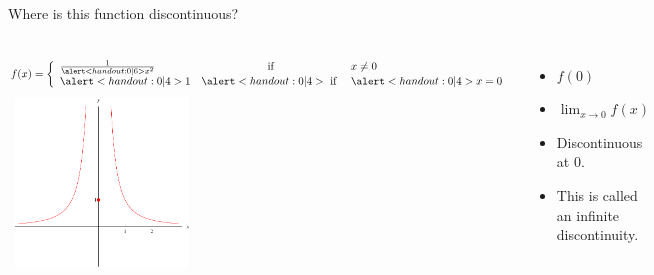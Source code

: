 \begin{frame}
\begin{example}[Example 2b, p. 114]
Where is this function discontinuous?
\begin{columns}[c]
\[
f(x) = \left\{ \begin{array}{lcl}
\frac{1}{\alert<handout:0 |6>{x^2}} & \text{ if } & x \neq 0 \\
\alert<handout:0 |4>{1} & \alert<handout:0 |4>{\text{ if }} & \alert<handout:0 |4>{x = 0} \\
\end{array}\right.
\]
\ \includegraphics[height=4.5cm]{continuity/pictures/02-05-ex2b.pdf}%
\begin{itemize}
\item<2-| alert@3-4>  $f(0)$ 
\item<2-| alert@5-6>  $\lim_{x\rightarrow 0} f(x)$ 
\item<7->  Discontinuous at 0.
\item<8->  This is called an infinite discontinuity. 
\end{itemize}
\end{columns}
\end{example}
\end{frame}


